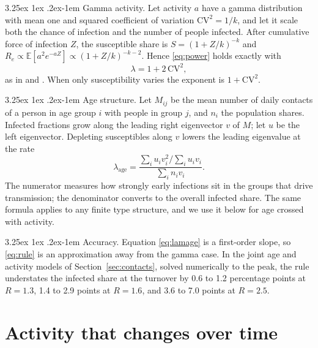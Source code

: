 \documentclass[11pt]{article}
\makeatletter
\renewcommand\paragraph{\@startsection{paragraph}{4}{\z@}%
  {3.25ex \@plus1ex \@minus.2ex}{-1em}%
  {\normalfont\normalsize\itshape}}
\theoremstyle{remark}
\newcommand{\CV}{\mathrm{CV}}
\makeatother
\begin{document}
\paragraph{Gamma activity.} Let activity $a$ have a gamma distribution with mean one and squared coefficient of
variation $\CV^2 = 1/k$, and let it scale both the chance of infection and the number of people infected. After
cumulative force of infection $Z$, the susceptible share is $S = (1 + Z/k)^{-k}$ and $R_e \propto \mathbb{E}[a^2
e^{-aZ}] \propto (1 + Z/k)^{-k-2}$. Hence \eqref{eq:power} holds exactly with
\begin{equation}\label{eq:gamma}
  \lambda = 1 + 2\,\CV^2 ,
\end{equation}
as in \citet[eqs.~21--22]{gomes2022} and \citet[eq.~14]{tkachenko2021}. When only susceptibility varies the exponent
is $1 + \CV^2$.

\paragraph{Age structure.} Let $M_{ij}$ be the mean number of daily contacts of a person in age group $i$ with people
in group $j$, and $n_i$ the population shares. Infected fractions grow along the leading right eigenvector $v$ of $M$;
let $u$ be the left eigenvector. Depleting susceptibles along $v$ lowers the leading eigenvalue at the rate
\begin{equation}\label{eq:lamage}
  \lambda_{\text{age}} = \frac{\sum_i u_i v_i^2 \big/ \sum_i u_i v_i}{\sum_i n_i v_i}.
\end{equation}
The numerator measures how strongly early infections sit in the groups that drive transmission; the denominator
converts to the overall infected share. The same formula applies to any finite type structure, and we use it below
for age crossed with activity.

\paragraph{Accuracy.} Equation \eqref{eq:lamage} is a first-order slope, so \eqref{eq:rule} is an approximation away
from the gamma case. In the joint age and activity models of Section~\ref{sec:contacts}, solved numerically to the
peak, the rule understates the infected share at the turnover by 0.6 to 1.2 percentage points at $R = 1.3$, 1.4 to
2.9 points at $R = 1.6$, and 3.6 to 7.0 points at $R = 2.5$.

\section{Activity that changes over time}\label{sec:switching}
\end{document}
